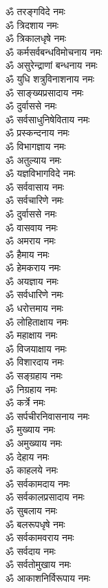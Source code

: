\begin{multicols}{2}
\begin{flushleft}
ॐ तरङ्गविदे नमः\\
ॐ त्रिदशाय नमः\\
ॐ त्रिकालधृषे नमः\\
ॐ कर्मसर्वबन्धविमोचनाय नमः\\
ॐ असुरेन्द्राणां बन्धनाय नमः\\
ॐ युधि शत्रुविनाशनाय नमः\\
ॐ साङ्ख्यप्रसादाय नमः\\
ॐ दुर्वाससे नमः\hfill{}\\
ॐ सर्वसाधुनिषेविताय नमः\\
ॐ प्रस्कन्दनाय नमः\\
ॐ विभागज्ञाय नमः\\
ॐ अतुल्याय नमः\\
ॐ यज्ञविभागविदे नमः\\
ॐ सर्ववासाय नमः\\
ॐ सर्वचारिणे नमः\\
ॐ दुर्वाससे नमः\\
ॐ वासवाय नमः\\
ॐ अमराय नमः\hfill{}\\
ॐ हैमाय नमः\\
ॐ हेमकराय नमः\\
ॐ अयज्ञाय नमः\\
ॐ सर्वधारिणे नमः\\
ॐ धरोत्तमाय नमः\\
ॐ लोहिताक्षाय नमः\\
ॐ महाक्षाय नमः\\
ॐ विजयाक्षाय नमः\\
ॐ विशारदाय नमः\\
ॐ सङ्ग्रहाय नमः\hfill{}\\
ॐ निग्रहाय नमः\\
ॐ कर्त्रे नमः\\
ॐ सर्पचीरनिवासनाय नमः\\
ॐ मुख्याय नमः\\
ॐ अमुख्याय नमः\\
ॐ देहाय नमः\\
ॐ काहलये नमः\\
ॐ सर्वकामदाय नमः\\
ॐ सर्वकालप्रसादाय नमः\\
ॐ सुबलाय नमः\hfill{}\\
ॐ बलरूपधृषे नमः\\
ॐ सर्वकामवराय नमः\\
ॐ सर्वदाय नमः\\
ॐ सर्वतोमुखाय नमः\\
ॐ आकाशनिर्विरूपाय नमः\\

\end{flushleft}
\end{multicols}
